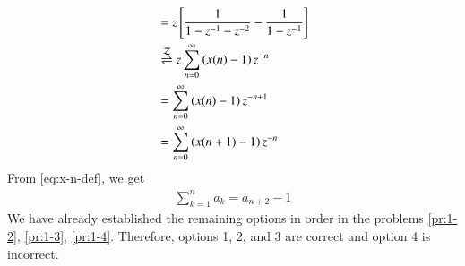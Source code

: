 \documentclass[journal,12pt,twocolumn]{IEEEtran}
\renewcommand\thesection{\arabic{section}}
\begin{document}
\begin{enumerate}[label=\thesection.\arabic*,ref=\thesection.\theenumi]
\begin{align}
    &= z{}\left[\frac{1}{1 - z^{-1} - z^{-2}} - \frac{1}{1 - z^{-1}}\right] \\
    &\overset{\mathcal{Z}}{ \rightleftharpoons} z\sum_{n = 0}^{\infty}\left(x(n) - 1\right)z^{-n} \\
    &= \sum_{n = 0}^{\infty}\left(x(n) - 1\right)z^{-n + 1} \\
    &= \sum_{n = 0}^{\infty}\left(x(n + 1) - 1\right)z^{-n} \\
\end{align}
From \eqref{eq:x-n-def}, we get
\begin{align}
    \sum_{k = 1}^{n}a_k = a_{n+2} - 1
\end{align}
We have already established the remaining options in order in the problems
\eqref{pr:1-2}, \eqref{pr:1-3}, \eqref{pr:1-4}. Therefore, options 1, 2,
and 3 are correct and option 4 is incorrect.
\end{enumerate}
\end{document}
